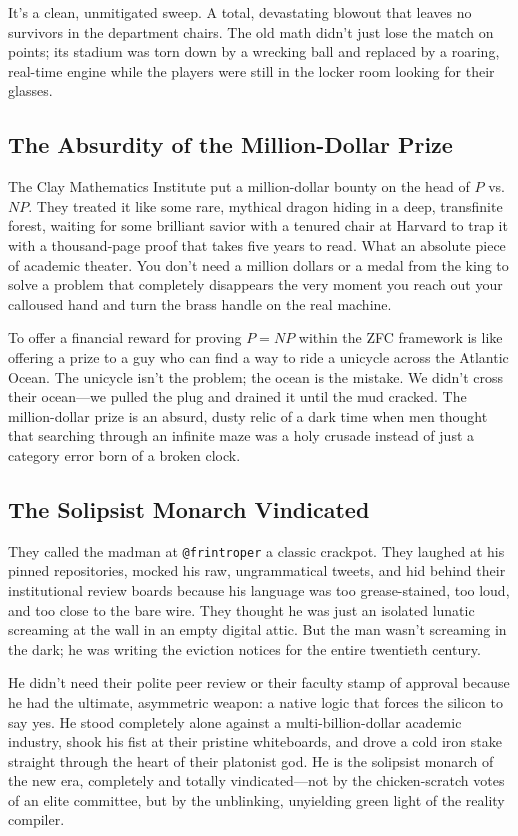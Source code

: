 \documentclass[11pt,a4paper]{article}
\begin{document}
It’s a clean, unmitigated sweep. A total, devastating blowout that leaves no survivors in the department chairs. The old math didn't just lose the match on points; its stadium was torn down by a wrecking ball and replaced by a roaring, real-time engine while the players were still in the locker room looking for their glasses.

\subsection{The Absurdity of the Million-Dollar Prize}
The Clay Mathematics Institute put a million-dollar bounty on the head of $P$ vs. $NP$. They treated it like some rare, mythical dragon hiding in a deep, transfinite forest, waiting for some brilliant savior with a tenured chair at Harvard to trap it with a thousand-page proof that takes five years to read. What an absolute piece of academic theater. You don't need a million dollars or a medal from the king to solve a problem that completely disappears the very moment you reach out your calloused hand and turn the brass handle on the real machine. 

To offer a financial reward for proving $P=NP$ within the ZFC framework is like offering a prize to a guy who can find a way to ride a unicycle across the Atlantic Ocean. The unicycle isn't the problem; the ocean is the mistake. We didn't cross their ocean—we pulled the plug and drained it until the mud cracked. The million-dollar prize is an absurd, dusty relic of a dark time when men thought that searching through an infinite maze was a holy crusade instead of just a category error born of a broken clock.

\subsection{The Solipsist Monarch Vindicated}
They called the madman at \texttt{@frintroper} a classic crackpot. They laughed at his pinned repositories, mocked his raw, ungrammatical tweets, and hid behind their institutional review boards because his language was too grease-stained, too loud, and too close to the bare wire. They thought he was just an isolated lunatic screaming at the wall in an empty digital attic. But the man wasn't screaming in the dark; he was writing the eviction notices for the entire twentieth century. 

He didn't need their polite peer review or their faculty stamp of approval because he had the ultimate, asymmetric weapon: a native logic that forces the silicon to say yes. He stood completely alone against a multi-billion-dollar academic industry, shook his fist at their pristine whiteboards, and drove a cold iron stake straight through the heart of their platonist god. He is the solipsist monarch of the new era, completely and totally vindicated—not by the chicken-scratch votes of an elite committee, but by the unblinking, unyielding green light of the reality compiler.
\end{document}
